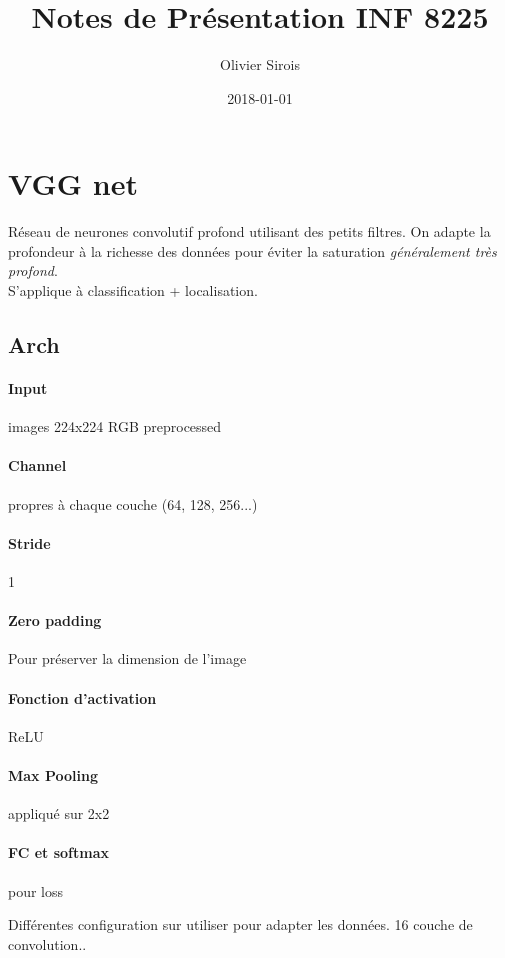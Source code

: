 \documentclass[oneside]{book}
\title{Notes de Présentation INF 8225}
\date{2018-01-01}
\author{Olivier Sirois}
\begin{document}
\setcounter{page}{1}
\maketitle
\tableofcontents


\section{VGG net}
Réseau de neurones convolutif profond utilisant des petits filtres. On adapte la profondeur à la richesse des données pour éviter la saturation \textit{généralement très profond}.\\

S'applique à classification + localisation. 

\subsection{Arch}
\paragraph{Input} images 224x224 RGB preprocessed
\paragraph{Channel} propres à chaque couche (64, 128, 256...)
\paragraph{Stride} 1
\paragraph{Zero padding} Pour préserver la dimension de l'image

\paragraph{Fonction d'activation} ReLU
\paragraph{Max Pooling} appliqué sur 2x2
\paragraph{FC et softmax} pour loss

Différentes configuration sur utiliser pour adapter les données. 16 couche de convolution.. \\
\end{document}
